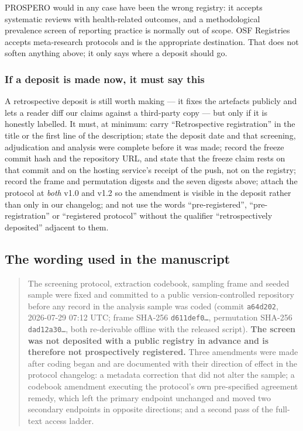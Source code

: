 \documentclass[11pt,a4paper]{article}
\begin{document}
PROSPERO would in any case have been the wrong registry: it accepts systematic reviews
with health-related outcomes, and a methodological prevalence screen of reporting
practice is normally out of scope. OSF Registries accepts meta-research protocols and
is the appropriate destination. That does not soften anything above; it only says where
a deposit should go.

\subsubsection*{If a deposit is made now, it must say this}

A retrospective deposit is still worth making --- it fixes the artefacts publicly and
lets a reader diff our claims against a third-party copy --- but only if it is honestly
labelled. It must, at minimum: carry ``Retrospective registration'' in the title or the
first line of the description; state the deposit date and that screening, adjudication
and analysis were complete before it was made; record the freeze commit hash and the
repository URL, and state that the freeze claim rests on that commit and on the hosting
service's receipt of the push, not on the registry; record the frame and permutation
digests and the seven digests above; attach the protocol at \emph{both} v1.0 and v1.2
so the amendment is visible in the deposit rather than only in our changelog; and not
use the words ``pre-registered'', ``pre-registration'' or ``registered protocol''
without the qualifier ``retrospectively deposited'' adjacent to them.

\subsection{The wording used in the manuscript}

\begin{quote}
The screening protocol, extraction codebook, sampling frame and seeded sample were
fixed and committed to a public version-controlled repository before any record in the
analysis sample was coded (commit \texttt{a64d202}, 2026-07-29 07:12 UTC; frame SHA-256
\texttt{d611def0\ldots}, permutation SHA-256 \texttt{dad12a30\ldots}, both re-derivable
offline with the released script). \textbf{The screen was not deposited with a public
registry in advance and is therefore not prospectively registered.} Three amendments
were made after coding began and are documented with their direction of effect in the
protocol changelog: a metadata correction that did not alter the sample; a codebook
amendment executing the protocol's own pre-specified agreement remedy, which left the
primary endpoint unchanged and moved two secondary endpoints in opposite directions;
and a second pass of the full-text access ladder.
\end{quote}
\end{document}
